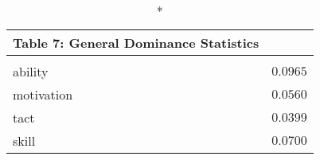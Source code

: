 \begin{longtable}{l|r}
\caption*{
{\large Table 7: General Dominance Statistics}
} \\ 
\toprule
\multicolumn{1}{l}{} &  \\ 
\midrule\addlinespace[2.5pt]
ability & $0.0965$ \\ 
motivation & $0.0560$ \\ 
tact & $0.0399$ \\ 
skill & $0.0700$ \\ 
\bottomrule
\end{longtable}

